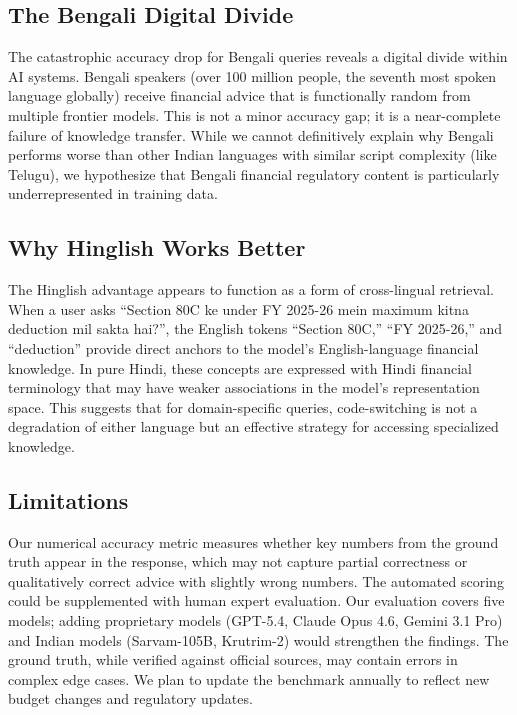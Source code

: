 \subsection{The Bengali Digital Divide}

The catastrophic accuracy drop for Bengali queries reveals a digital divide within AI systems. Bengali speakers (over 100 million people, the seventh most spoken language globally) receive financial advice that is functionally random from multiple frontier models. This is not a minor accuracy gap; it is a near-complete failure of knowledge transfer. While we cannot definitively explain why Bengali performs worse than other Indian languages with similar script complexity (like Telugu), we hypothesize that Bengali financial regulatory content is particularly underrepresented in training data.

\subsection{Why Hinglish Works Better}

The Hinglish advantage appears to function as a form of cross-lingual retrieval. When a user asks ``Section 80C ke under FY 2025-26 mein maximum kitna deduction mil sakta hai?'', the English tokens ``Section 80C,'' ``FY 2025-26,'' and ``deduction'' provide direct anchors to the model's English-language financial knowledge. In pure Hindi, these concepts are expressed with Hindi financial terminology that may have weaker associations in the model's representation space. This suggests that for domain-specific queries, code-switching is not a degradation of either language but an effective strategy for accessing specialized knowledge.

\subsection{Limitations}

Our numerical accuracy metric measures whether key numbers from the ground truth appear in the response, which may not capture partial correctness or qualitatively correct advice with slightly wrong numbers. The automated scoring could be supplemented with human expert evaluation. Our evaluation covers five models; adding proprietary models (GPT-5.4, Claude Opus 4.6, Gemini 3.1 Pro) and Indian models (Sarvam-105B, Krutrim-2) would strengthen the findings. The ground truth, while verified against official sources, may contain errors in complex edge cases. We plan to update the benchmark annually to reflect new budget changes and regulatory updates.

